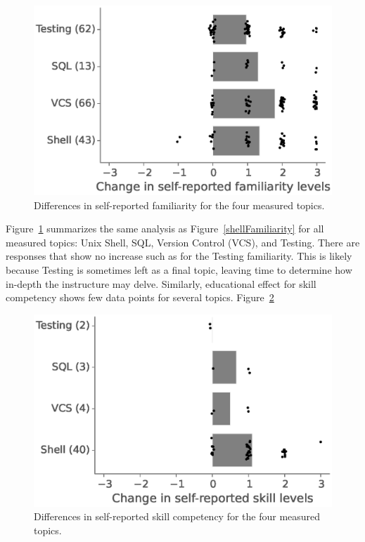 \documentclass[10pt, twocolumn]{article}
\begin{document}
\begin{figure}
\centering
\includegraphics[width=\linewidth]{figures/AvgFamiliarityEffect}
\caption{
    Differences in self-reported familiarity for the four measured topics.
\label{AvgFamiliarityEffect}}

\end{figure}

Figure~\ref{AvgFamiliarityEffect} summarizes the same analysis as Figure~\ref{shellFamiliarity}
for all measured topics: Unix Shell, SQL, Version Control (VCS), and Testing.
There are responses that show no increase such as for the Testing familiarity.
This is likely because Testing is sometimes left as a final topic,
leaving time to determine how in-depth the instructure may delve. 
Similarly, educational effect for skill competency
shows few data points for several topics. Figure~\ref{AvgSkillEffect}

\begin{figure}
\centering
\includegraphics[width=\linewidth]{figures/AvgSkillEffect}
\caption{
    Differences in self-reported skill competency for the four measured topics.
\label{AvgSkillEffect}}

\end{figure}
\end{document}
